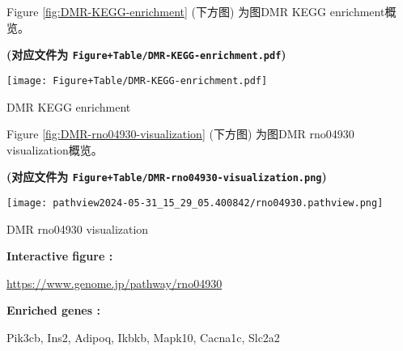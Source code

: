 \documentclass[
]{article}
\begin{document}
Figure \ref{fig:DMR-KEGG-enrichment} (下方图) 为图DMR KEGG enrichment概览。

\textbf{(对应文件为 \texttt{Figure+Table/DMR-KEGG-enrichment.pdf})}

\def\@captype{figure}
\begin{center}
\texttt{[image: Figure+Table/DMR-KEGG-enrichment.pdf]}
\caption{DMR KEGG enrichment}\label{fig:DMR-KEGG-enrichment}
\end{center}

\begin{center}\vspace{1.5cm}\end{center}

\begin{center}\vspace{1.5cm}\end{center}

Figure \ref{fig:DMR-rno04930-visualization} (下方图) 为图DMR rno04930 visualization概览。

\textbf{(对应文件为 \texttt{Figure+Table/DMR-rno04930-visualization.png})}

\def\@captype{figure}
\begin{center}
\texttt{[image: pathview2024-05-31\_15\_29\_05.400842/rno04930.pathview.png]}
\caption{DMR rno04930 visualization}\label{fig:DMR-rno04930-visualization}
\end{center}
\begin{center}\begin{tcolorbox}[colback=gray!10, colframe=gray!50, width=0.9\linewidth, arc=1mm, boxrule=0.5pt]
\textbf{
Interactive figure
:}

\vspace{0.5em}

    \url{https://www.genome.jp/pathway/rno04930}

\vspace{2em}


\textbf{
Enriched genes
:}

\vspace{0.5em}

    Pik3cb, Ins2, Adipoq, Ikbkb, Mapk10, Cacna1c, Slc2a2

\vspace{2em}
\end{tcolorbox}
\end{center}
\end{document}
